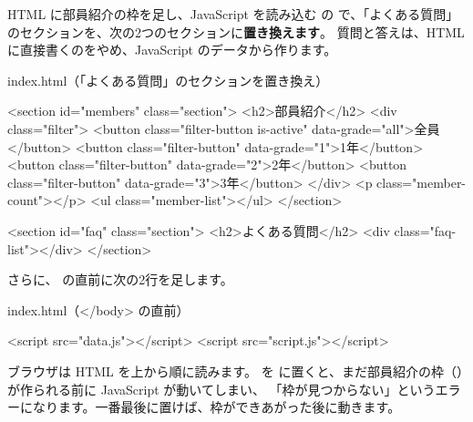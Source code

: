 \begin{step}{HTML に部員紹介の枠を足し、JavaScript を読み込む}
 の  で、「よくある質問」のセクションを、次の2つのセクションに\textbf{置き換えます}。
質問と答えは、HTML に直接書くのをやめ、JavaScript のデータから作ります。
\begin{filebox}{index.html（「よくある質問」のセクションを置き換え）}
\begin{Piton}[language=code]
    <section id="members" class="section">
      <h2>部員紹介</h2>
      <div class="filter">
        <button class="filter-button is-active" data-grade="all">全員</button>
        <button class="filter-button" data-grade="1">1年</button>
        <button class="filter-button" data-grade="2">2年</button>
        <button class="filter-button" data-grade="3">3年</button>
      </div>
      <p class="member-count"></p>
      <ul class="member-list"></ul>
    </section>

    <section id="faq" class="section">
      <h2>よくある質問</h2>
      <div class="faq-list"></div>
    </section>
\end{Piton}
\end{filebox}
さらに、 の直前に次の2行を足します。
\begin{filebox}{index.html（</body> の直前）}
\begin{Piton}[language=code]
  <script src="data.js"></script>
  <script src="script.js"></script>
\end{Piton}
\end{filebox}
\end{step}

\begin{why}
ブラウザは HTML を上から順に読みます。
 を  に置くと、まだ部員紹介の枠（）が作られる前に JavaScript が動いてしまい、
「枠が見つからない」というエラーになります。一番最後に置けば、枠ができあがった後に動きます。
\end{why}

